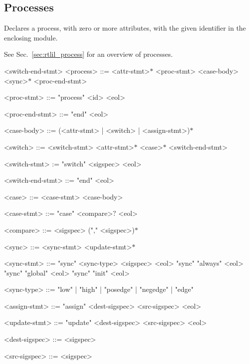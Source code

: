 \subsection{Processes}

Declares a process, with zero or more attributes, with the given identifier in the enclosing module.

See Sec.~\ref{sec:rtlil_process} for an overview of processes.

\begin{indentgrammar}{<switch-end-stmt>}
<process> ::= <attr-stmt>$*$ <proc-stmt> <case-body> <sync>$*$ <proc-end-stmt>

<proc-stmt> ::= "process" <id> <eol>

<proc-end-stmt> ::= "end" <eol>

<case-body> ::= (<attr-stmt> | <switch> | <assign-stmt>)$*$

<switch> ::= <switch-stmt> <attr-stmt>$*$ <case>$*$ <switch-end-stmt>

<switch-stmt> := "switch" <sigspec> <eol>

<switch-end-stmt> ::= "end" <eol>

<case> ::= <case-stmt> <case-body>

<case-stmt> ::= "case" <compare>$?$ <eol>

<compare> ::= <sigspec> ("," <sigspec>)$*$

<sync> ::= <sync-stmt> <update-stmt>$*$

<sync-stmt> ::= 
"sync" <sync-type> <sigspec> <eol>
  \alt "sync" "always" <eol>
  \alt "sync" "global" <eol>
  \alt "sync" "init" <eol>

<sync-type> ::= "low" | "high" | "posedge" | "negedge" | "edge"

<assign-stmt> ::= "assign" <dest-sigspec> <src-sigspec> <eol>

<update-stmt> ::= "update" <dest-sigspec> <src-sigspec> <eol>

<dest-sigspec> ::= <sigspec>

<src-sigspec> ::= <sigspec>
\end{indentgrammar}
